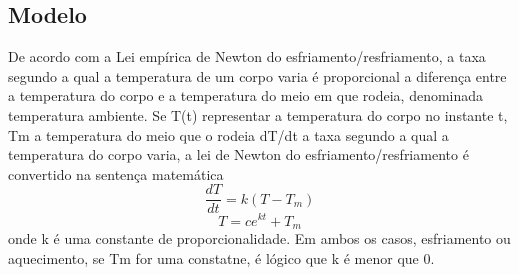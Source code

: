 \documentclass[12pt]{article}
\begin{document}
\subsection{Modelo}
De acordo com a Lei empírica de Newton do esfriamento/resfriamento, a taxa segundo a qual a temperatura de um corpo varia é proporcional a diferença entre a temperatura do corpo e a temperatura do meio em que rodeia, denominada temperatura ambiente. Se T(t) representar a temperatura do corpo no instante t, Tm a temperatura do meio que o rodeia dT/dt a taxa segundo a qual a temperatura do corpo varia, a lei de Newton do esfriamento/resfriamento é convertido na sentença matemática
\begin{equation}
    \frac{dT}{dt} = k(T-T_m)
\label{eq_3_41}
\end{equation}
\begin{equation}
    T = ce^{kt}+T_m
\label{eq_3_42}
\end{equation}
onde k é uma constante de proporcionalidade. Em ambos os casos, esfriamento ou aquecimento, se Tm for uma constatne, é lógico que k é menor que 0.
\end{document}
